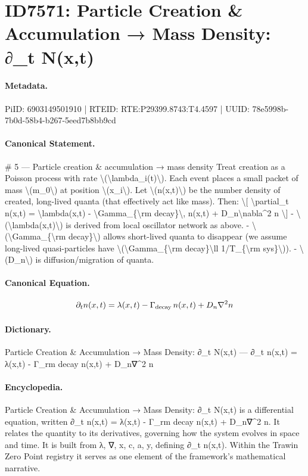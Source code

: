 \section*{ID7571: Particle Creation \& Accumulation → Mass Density: ∂\_t N(x,t)}
\paragraph{Metadata.}
PiID: 6903149501910 | RTEID: RTE:P29399.8743:T4.4597 | UUID: 78e5998b-7b0d-58b4-b267-5eed7b8bb9cd

\paragraph{Canonical Statement.}
\# 5 — Particle creation \& accumulation → mass density Treat creation as a Poisson process with rate \textbackslash{}(\textbackslash{}lambda\_i(t)\textbackslash{}). Each event places a small packet of mass \textbackslash{}(m\_0\textbackslash{}) at position \textbackslash{}(x\_i\textbackslash{}). Let \textbackslash{}(n(x,t)\textbackslash{}) be the number density of created, long-lived quanta (that effectively act like mass). Then: \textbackslash{}[ \textbackslash{}partial\_t n(x,t) = \textbackslash{}lambda(x,t) - \textbackslash{}Gamma\_\{\textbackslash{}rm decay\}\textbackslash{}, n(x,t) + D\_n\textbackslash{}nabla\textasciicircum{}2 n \textbackslash{}] - \textbackslash{}(\textbackslash{}lambda(x,t)\textbackslash{}) is derived from local oscillator network as above. - \textbackslash{}(\textbackslash{}Gamma\_\{\textbackslash{}rm decay\}\textbackslash{}) allows short-lived quanta to disappear (we assume long-lived quasi-particles have \textbackslash{}(\textbackslash{}Gamma\_\{\textbackslash{}rm decay\}\textbackslash{}ll 1/T\_\{\textbackslash{}rm sys\}\textbackslash{})). - \textbackslash{}(D\_n\textbackslash{}) is diffusion/migration of quanta.

\paragraph{Canonical Equation.}
\[
\partial_t n(x,t) = \lambda(x,t) - \Gamma_{\rm decay}\, n(x,t) + D_n\nabla^2 n
\]

\paragraph{Dictionary.}
Particle Creation \& Accumulation → Mass Density: ∂\_t N(x,t) — ∂\_t n(x,t) = λ(x,t) - Γ\_rm decay n(x,t) + D\_n∇\textasciicircum{}2 n

\paragraph{Encyclopedia.}
Particle Creation \& Accumulation → Mass Density: ∂\_t N(x,t) is a differential equation, written ∂\_t n(x,t) = λ(x,t) - Γ\_rm decay n(x,t) + D\_n∇\textasciicircum{}2 n. It relates the quantity to its derivatives, governing how the system evolves in space and time. It is built from λ, ∇, x, c, a, y, defining ∂\_t n(x,t). Within the Trawin Zero Point registry it serves as one element of the framework's mathematical narrative.
